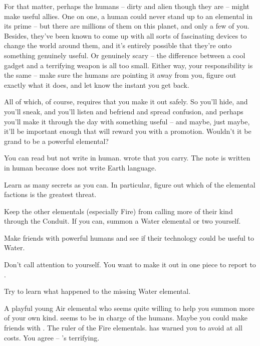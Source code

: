 \documentclass[char]{elementals}
\begin{document}
For that matter, perhaps the humans -- dirty and alien though they are -- might make useful allies. One on one, a human could never stand up to an elemental in its prime -- but there are millions of them on this planet, and only a few of you. Besides, they've been known to come up with all sorts of fascinating devices to change the world around them, and it's entirely possible that they're onto something genuinely useful. Or genuinely scary -- the difference between a cool gadget and a terrifying weapon is all too small. Either way, your responsibility is the same -- make sure the humans are pointing it away from you, figure out exactly what it does, and let \cWaterQueen{} know the instant you get back.

All of which, of course, requires that you make it out safely. So you'll hide, and you'll sneak, and you'll listen and befriend and spread confusion, and perhaps you'll make it through the day with something useful -- and maybe, just maybe, it'll be important enough that \cWaterQueen{} will reward you with a promotion. Wouldn't it be grand to be a powerful elemental?

\begin{itemz}[Notes]
	\item  You can read but not write in human. \cWaterQueen{} wrote \iNoteWaterEarth{} that you carry. The note is written in human because \cWaterQueen{} does not write Earth language.
\end{itemz}

\begin{itemz}[Goals]
	\item  Learn as many secrets as you can. In particular, figure out which of the elemental factions is the greatest threat.
	\item  Keep the other elementals (especially Fire) from calling more of their kind through the Conduit. If you can, summon a Water elemental or two yourself.
	\item  Make friends with powerful humans and see if their technology could be useful to Water.
	\item  Don't call attention to yourself. You want to make it out in one piece to report to \cWaterQueen{}.
	\item  Try to learn what happened to the missing Water elemental.
\end{itemz}

\begin{contacts}
	\contact{\cMiniAir{\intro}} A playful young Air elemental who seems quite willing to help you summon more of your own kind.
	\contact{\cLeader{\intro}} \cLeader{\They} seems to be in charge of the humans. Maybe you could make friends with \cLeader{\them}.
  \contact{\cQueen{\intro}} The ruler of the Fire elementals. \cWaterQueen{} has warned you to avoid \cQueen{\them} at all costs. You agree -- \cQueen{\they}'s terrifying.
\end{contacts} 
\end{document}
